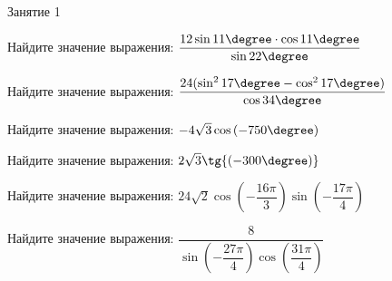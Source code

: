%

\begin{class}[number=1]
	\begin{listofex}
		\item Занятие 1
	\end{listofex}
\end{class}

\begin{homework}[number=1]
	\begin{listofex}
		\item Найдите значение выражения: \( \dfrac{12 \sin{11\degree} \cdot \cos{11\degree}}{\sin{22\degree}} \)
		\item Найдите значение выражения: \( \dfrac{24 (\sin^2{17\degree} - \cos^2{17\degree})}{\cos{34\degree}} \)
		\item Найдите значение выражения: \( -4\sqrt{3}\cos{(-750\degree)} \)
		\item Найдите значение выражения: \( 2\sqrt{3}\tg{(-300\degree)} \)
		\item Найдите значение выражения: \( 24\sqrt{2}\cos{\left( -\dfrac{16\pi}{3}\right)}\sin{\left( -\dfrac{17\pi}{4} \right)} \)
		\item Найдите значение выражения: \( \dfrac{8}{\sin{\left(-\dfrac{27\pi}{4}\right)}\cos{\left(\dfrac{31\pi}{4}\right)}} \)
		

\end{listofex}
\end{homework}
